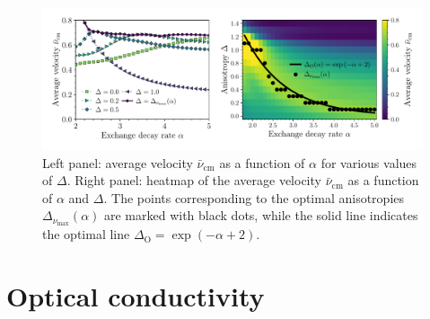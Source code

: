 \begin{figure}[htbp]
  \centering
  \includegraphics[width=\linewidth]{Figures/optimal_velocity.pdf}
  \caption{Left panel: average velocity \(\bar{\nu}_{\text{cm}}\) as a function of \(\alpha\) for various values of \(\Delta\).
  Right panel: heatmap of the average velocity \(\bar{\nu}_{\text{cm}}\) as a function of \(\alpha\) and \(\Delta\). The points
  corresponding to the optimal anisotropies \(\Delta_{\nu_{\mathrm{max}}} (\alpha)\) are marked with black dots, while the solid line
  indicates the optimal line \(\Delta_{\mathrm{O}} = \exp\left(-\alpha + 2\right)\).}
  \label{fig:optimal_velocity}
\end{figure}
\vspace*{-1cm}
\section{Optical conductivity}


